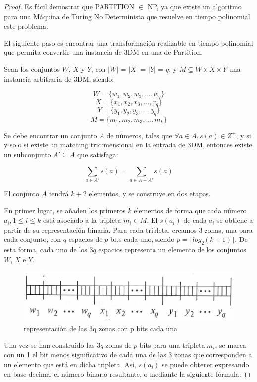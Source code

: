 \documentclass[11pt, a4paper, oneside]{memoir}
\begin{document}
\begin{proof}
Es fácil demostrar que PARTITION $\in$ NP, ya que existe un algoritmo para una Máquina de Turing No Determinista que resuelve en tiempo polinomial este problema.

El siguiente paso es encontrar una transformación realizable en tiempo polinomial que permita convertir una instancia de 3DM en una de Partition.

Sean los conjuntos $W$, $X$ y $Y$, con  $|W|$ = $|X|$ = $|Y|$ = $q$; y \(M \subseteq W \times X \times Y\) una instancia arbitraria de 3DM, siendo:

\newpage

\[W = \{w_{1},w_{2},w_{3},...,w_{q}\}\]
\[X = \{x_{1},x_{2},x_{3},...,x_{q}\}\]
\[Y = \{y_{1},y_{2},y_{3},...,y_{q}\}\]
\[M = \{m_{1},m_{2},m_{3},...,m_{k}\}\]


Se debe encontrar un conjunto $A$ de números, tales que $\forall a \in A, s(a) \in Z^+$, y si y solo si existe un matching tridimensional en la entrada de 3DM, entonces existe un subconjunto $A' \subseteq A$ que satisfaga:

 \[ \sum_{a\in A'}s(a)= \sum_{a\in A - A'}s(a)\]

El conjunto $A$ tendrá $k+2$ elementos, y se construye en dos etapas.

En primer lugar, se añaden los primeros $k$ elementos de forma que cada número $a_i, 1 \leq i \leq k$ está asociado a la tripleta $m_i \in M$.
El $s(a_i)$ de cada $a_i$ se obtiene a partir de su representación binaria. Para cada tripleta, creamos 3 zonas, una para cada conjunto, con $q$ espacios de $p$ bits cada uno, siendo $p = \lceil log_2(k+1) \rceil$. De esta forma, cada uno de los $3q$ espacios representa un elemento de los conjuntos $W$, $X$ e $Y$.

\begin{figure}[H]
    \centering
    \includegraphics[width=.9\linewidth,height=.25\textheight,keepaspectratio]{Tabla}
    \caption{representación de las 3q zonas con p bits cada una}
    \label{fig:my_label}
\end{figure}

Una vez se han construido las $3q$ zonas de $p$ bits para una tripleta $m_i$, se marca con un 1 el bit menos significativo de cada una de las 3 zonas que corresponden a un elemento que está en dicha tripleta. Así, $s(a_i)$ se puede obtener expresando en base decimal el número binario resultante, o mediante la siguiente fórmula:


\end{proof}
\end{document}
